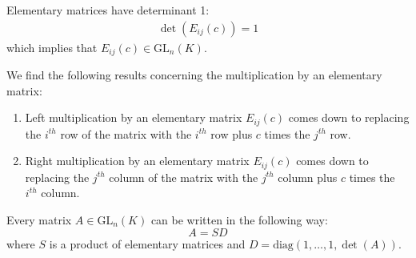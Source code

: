         \begin{property}
        	Elementary matrices have determinant 1:
		\begin{gather}
			\det(E_{ij}(c)) = 1
		\end{gather}
		which implies that $E_{ij}(c)\in\text{GL}_n(K)$.
	\end{property}
        \begin{property}
		We find the following results concerning the multiplication by an elementary matrix:
	        \begin{enumerate}
			\item Left multiplication by an elementary matrix $E_{ij}(c)$ comes down to replacing the $i^{th}$ row of the matrix with the $i^{th}$ row plus $c$ times the $j^{th}$ row.
                	\item Right multiplication by an elementary matrix $E_{ij}(c)$ comes down to replacing the $j^{th}$ column of the matrix with the $j^{th}$ column plus $c$ times the $i^{th}$ column.
		\end{enumerate}
	\end{property}

        \begin{property}\label{linalgebra:theorem:elementary_matrices}
		Every matrix $A\in\text{GL}_n(K)$ can be written in the following way: \[A = SD\] where $S$ is a product of elementary matrices and $D=\text{diag}(1,\dotso,1,\det(A))$.
	\end{property}


